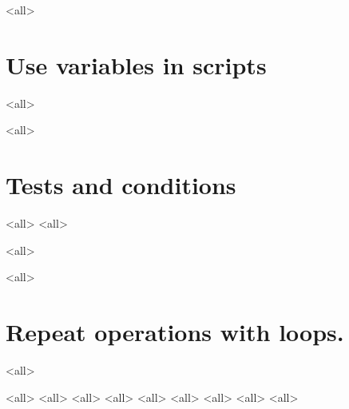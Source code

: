 
\mode<all>{}


\section{Use variables in scripts}
\mode<all>{}

\mode<all>{}

\section{Tests and conditions}

\mode<all>{}
\mode<all>{}

\mode<all>{}



\mode<all>{}




\section{Repeat operations with loops.}
\mode<all>{}


\mode<all>{}
\mode<all>{}
\mode<all>{}
\mode<all>{}
\mode<all>{}
\mode<all>{}
\mode<all>{}
\mode<all>{}
\mode<all>{}
%
